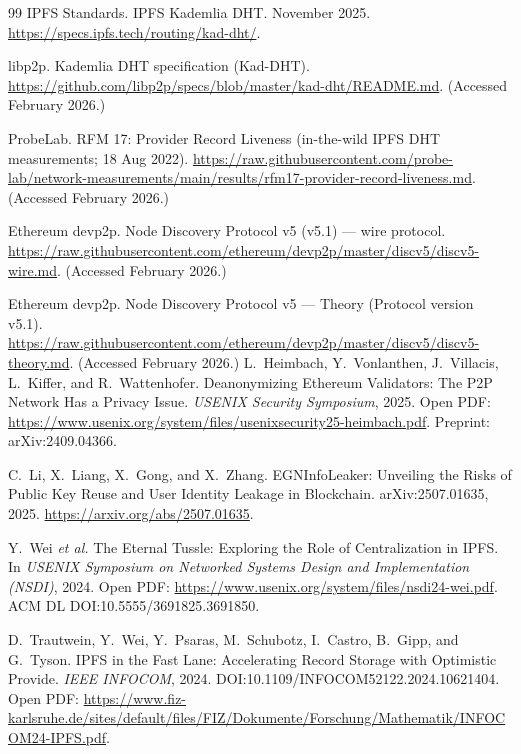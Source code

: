 \documentclass[11pt]{article}
\begin{document}
\begin{thebibliography}{99}
IPFS Standards.
\newblock IPFS Kademlia DHT.
 November 2025. \url{https://specs.ipfs.tech/routing/kad-dht/}.

libp2p.
\newblock Kademlia DHT specification (Kad-DHT).
\newblock \url{https://github.com/libp2p/specs/blob/master/kad-dht/README.md}. (Accessed February 2026.)

ProbeLab.
\newblock RFM 17: Provider Record Liveness (in-the-wild IPFS DHT measurements; 18 Aug 2022).
\newblock \url{https://raw.githubusercontent.com/probe-lab/network-measurements/main/results/rfm17-provider-record-liveness.md}. (Accessed February 2026.)

Ethereum devp2p.
\newblock Node Discovery Protocol v5 (v5.1) --- wire protocol.
\newblock \url{https://raw.githubusercontent.com/ethereum/devp2p/master/discv5/discv5-wire.md}. (Accessed February 2026.)

Ethereum devp2p.
\newblock Node Discovery Protocol v5 --- Theory (Protocol version v5.1).
\newblock \url{https://raw.githubusercontent.com/ethereum/devp2p/master/discv5/discv5-theory.md}. (Accessed February 2026.)
L.~Heimbach, Y.~Vonlanthen, J.~Villacis, L.~Kiffer, and R.~Wattenhofer.
\newblock Deanonymizing Ethereum Validators: The P2P Network Has a Privacy Issue.
\newblock \emph{USENIX Security Symposium}, 2025.
\newblock Open PDF: \url{https://www.usenix.org/system/files/usenixsecurity25-heimbach.pdf}.
\newblock Preprint: arXiv:2409.04366.

C.~Li, X.~Liang, X.~Gong, and X.~Zhang.
\newblock EGNInfoLeaker: Unveiling the Risks of Public Key Reuse and User Identity Leakage in Blockchain.
\newblock arXiv:2507.01635, 2025. \url{https://arxiv.org/abs/2507.01635}.


Y.~Wei \emph{et al.}
\newblock The Eternal Tussle: Exploring the Role of Centralization in IPFS.
\newblock In \emph{USENIX Symposium on Networked Systems Design and Implementation (NSDI)}, 2024.
\newblock Open PDF: \url{https://www.usenix.org/system/files/nsdi24-wei.pdf}.
\newblock ACM DL DOI:10.5555/3691825.3691850.

D.~Trautwein, Y.~Wei, Y.~Psaras, M.~Schubotz, I.~Castro, B.~Gipp, and G.~Tyson.
\newblock IPFS in the Fast Lane: Accelerating Record Storage with Optimistic Provide.
\newblock \emph{IEEE INFOCOM}, 2024.
\newblock DOI:10.1109/INFOCOM52122.2024.10621404.
\newblock Open PDF: \url{https://www.fiz-karlsruhe.de/sites/default/files/FIZ/Dokumente/Forschung/Mathematik/INFOCOM24-IPFS.pdf}. 


\end{thebibliography}
\end{document}
